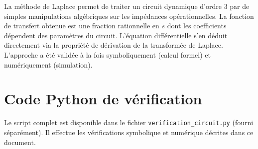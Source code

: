 \documentclass[12pt,a4paper]{article}
\begin{document}
La méthode de Laplace permet de traiter un circuit dynamique d'ordre 3 par de simples manipulations algébriques sur les impédances opérationnelles. La fonction de transfert obtenue est une fraction rationnelle en \(s\) dont les coefficients dépendent des paramètres du circuit. L'équation différentielle s'en déduit directement via la propriété de dérivation de la transformée de Laplace. L'approche a été validée à la fois symboliquement (calcul formel) et numériquement (simulation).

\appendix
\section{Code Python de vérification}
Le script complet est disponible dans le fichier \texttt{verification\_circuit.py} (fourni séparément). Il effectue les vérifications symbolique et numérique décrites dans ce document.
\end{document}
